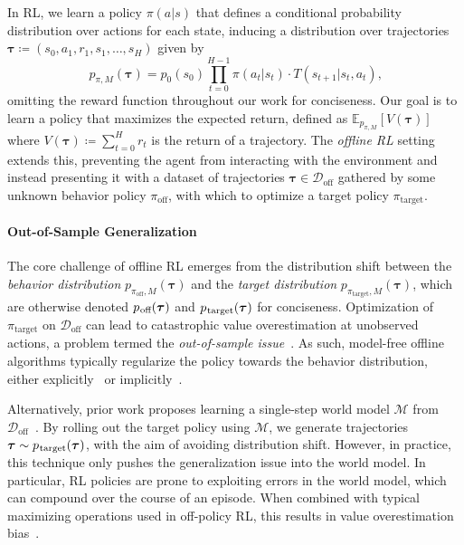 \documentclass[10pt]{article} %
\theoremstyle{plain}
\theoremstyle{definition}
\theoremstyle{remark}
\newcommand{\ptarg}{p_{\mkern1mu\text{target}}}
\newcommand{\poff}{p_{\mkern1mu\text{off}}}
\newcommand{\doff}{\mathcal{D}_{\text{off}}}
\begin{document}
In RL, we learn a policy $\pi(a|s)$ that defines a conditional probability distribution over actions for each state, inducing a distribution over trajectories $\bm{\tau} \coloneqq (s_0, a_1, r_1, s_1,\ldots, s_H)$ given by
\begin{equation}
    \label{eq:autoregressive}
    p_{\pi, M}(\bm{\tau}) = p_0(s_0) \prod_{t=0}^{H-1} \pi(a_t|s_t) \cdot T(s_{t+1}|s_t, a_t)\text{,}
\end{equation}
omitting the reward function throughout our work for conciseness.
Our goal is to learn a policy that maximizes the expected return, defined as $\mathbb{E}_{p_{\pi, M}}[V(\bm{\tau})]$ where $V(\bm{\tau}) \coloneqq \sum_{t=0}^{H}r_{t}$ is the return of a trajectory.
The \textit{offline RL} setting~\citep{levine2020offline} extends this, preventing the agent from interacting with the environment and instead presenting it with a dataset of trajectories $\bm{\tau} \in \doff$ gathered by some unknown behavior policy $\pi_{\text{off}}$, with which to optimize a target policy $\pi_{\text{target}}$.

\paragraph{Out-of-Sample Generalization}
The core challenge of offline RL emerges from the distribution shift between the \emph{behavior distribution} $p_{\pi_\text{off}, M}(\bm{\tau})$ and the \emph{target distribution} $p_{\pi_\text{target}, M}(\bm{\tau})$, which are otherwise denoted $\poff(\bm{\tau})$ and $\ptarg(\bm{\tau})$ for conciseness.
Optimization of $\pi_{\text{target}}$ on $\doff$ can lead to catastrophic value overestimation at unobserved actions, a problem termed the \emph{out-of-sample issue}~\citep{kostrikov2021offline}.
As such, model-free offline algorithms typically regularize the policy towards the behavior distribution, either explicitly~\citep{fujimoto2021minimalist, kumar2020conservative} or implicitly~\citep{kostrikov2021offline}.

Alternatively, prior work proposes learning a single-step world model $\mathcal{M}$ from $\doff$~\citep{mopo, kidambi2020morel, lu2022revisiting}.
By rolling out the target policy using $\mathcal{M}$, we generate trajectories $\bm{\tau} \sim \ptarg(\bm{\tau})$, with the aim of avoiding distribution shift.
However, in practice, this technique only pushes the generalization issue into the world model.
In particular, RL policies are prone to exploiting errors in the world model, which can compound over the course of an episode.
When combined with typical maximizing operations used in off-policy RL, this results in value overestimation bias~\citep{sims2024edgeofreach}.
\end{document}
